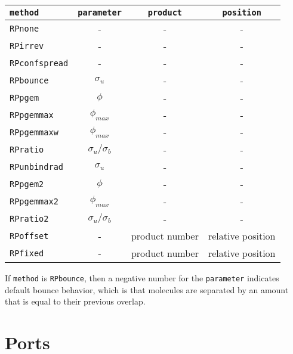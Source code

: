 \documentclass {book}
\begin{document}
\begin{description}
\begin{longtable}[c]{lccc}
\texttt{method} & \texttt{parameter} & \texttt{product} & \texttt{position}\\
\hline
\texttt{RPnone} & - & - & -\\
\texttt{RPirrev} & - & - & -\\
\texttt{RPconfspread} & - & - & -\\
\texttt{RPbounce} & $\sigma_u$ & - & -\\
\texttt{RPpgem} & $\phi$ & - & -\\
\texttt{RPpgemmax} & $\phi_{max}$ & - & -\\
\texttt{RPpgemmaxw} & $\phi_{max}$ & - & -\\
\texttt{RPratio} & $\sigma_u/\sigma_b$ & - & -\\
\texttt{RPunbindrad} & $\sigma_u$ & - & -\\
\texttt{RPpgem2} & $\phi$ & - & -\\
\texttt{RPpgemmax2} & $\phi_{max}$ & - & -\\
\texttt{RPratio2} & $\sigma_u/\sigma_b$ & - & -\\
\texttt{RPoffset} & - & product number & relative position\\
\texttt{RPfixed} & - & product number & relative position\\
\end{longtable}

If \texttt{method} is \texttt{RPbounce}, then a negative number for the \texttt{parameter} indicates default bounce behavior, which is that molecules are separated by an amount that is equal to their previous overlap.

\end{description}

\section{Ports}
\end{document}
